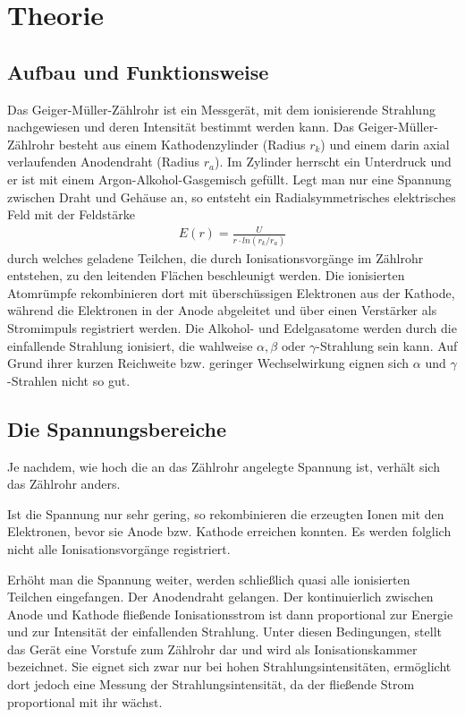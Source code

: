 
\section{Theorie}
\subsection{Aufbau und Funktionsweise}
Das Geiger-Müller-Zählrohr ist ein Messgerät, mit dem ionisierende Strahlung nachgewiesen und deren Intensität bestimmt werden kann. Das Geiger-Müller-Zählrohr besteht aus einem Kathodenzylinder (Radius $r_k$) und einem
darin axial verlaufenden Anodendraht (Radius $r_a$). Im Zylinder herrscht ein Unterdruck und er ist mit einem Argon-Alkohol-Gasgemisch gefüllt. Legt man nur eine Spannung zwischen Draht und Gehäuse an, so entsteht ein Radialsymmetrisches elektrisches Feld mit der Feldstärke
\begin{align}
	E(r)= \frac{U}{r\cdot ln (r_k / r_a)}
\end{align}
durch welches geladene Teilchen, die durch Ionisationsvorgänge im Zählrohr entstehen, zu den leitenden Flächen beschleunigt werden. Die ionisierten Atomrümpfe rekombinieren dort mit überschüssigen Elektronen aus der Kathode, während die Elektronen in der Anode abgeleitet und über einen Verstärker als Stromimpuls registriert werden.
Die Alkohol- und Edelgasatome werden durch die einfallende Strahlung ionisiert, die wahlweise $\alpha, \beta \text{ oder } \gamma$-Strahlung sein kann. Auf Grund ihrer kurzen Reichweite bzw. geringer Wechselwirkung eignen sich $\alpha \text{ und } \gamma$-Strahlen nicht so gut.

\subsection{Die Spannungsbereiche}
Je nachdem, wie hoch die an das Zählrohr angelegte Spannung ist, verhält sich das Zählrohr anders.

Ist die Spannung nur sehr gering, so rekombinieren die erzeugten Ionen mit den Elektronen, bevor sie Anode bzw. Kathode erreichen konnten. Es werden folglich nicht alle Ionisationsvorgänge registriert.

Erhöht man die Spannung weiter, werden schließlich quasi alle ionisierten Teilchen eingefangen. Der Anodendraht gelangen. Der kontinuierlich zwischen Anode und Kathode fließende Ionisationsstrom ist dann proportional zur Energie und zur Intensität der einfallenden Strahlung. Unter diesen Bedingungen, stellt das Gerät eine Vorstufe zum Zählrohr dar und wird als Ionisationskammer bezeichnet. Sie eignet sich zwar nur bei hohen Strahlungsintensitäten, ermöglicht dort jedoch eine Messung der Strahlungsintensität, da der fließende Strom proportional mit ihr wächst.

